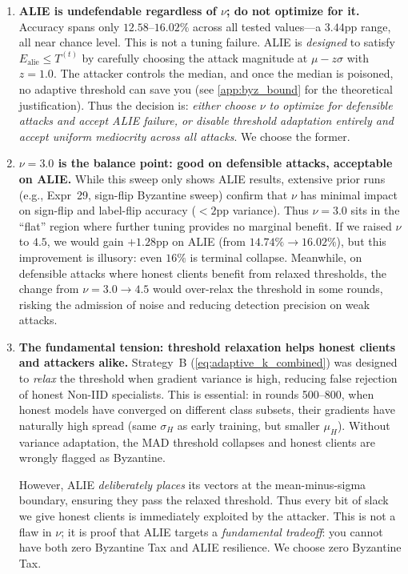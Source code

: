 \documentclass[../main]{subfiles}
\begin{document}
\begin{enumerate}
    \item \textbf{ALIE is undefendable regardless of $\nu$; do not optimize for it.}
    Accuracy spans only $12.58$--$16.02\%$ across all tested values---a $3.44$pp range, all near chance level.
    This is not a tuning failure. ALIE is \emph{designed} to satisfy $E_{\text{alie}} \leq T^{(t)}$ by carefully
    choosing the attack magnitude at $\mu - z\sigma$ with $z = 1.0$.
    The attacker controls the median, and once the median is poisoned, no adaptive threshold can save you
    (see \cref{app:byz_bound} for the theoretical justification).
    Thus the decision is: \emph{either choose $\nu$ to optimize for defensible attacks and accept ALIE failure,
    or disable threshold adaptation entirely and accept uniform mediocrity across all attacks}.
    We choose the former.

    \item \textbf{$\nu = 3.0$ is the balance point: good on defensible attacks, acceptable on ALIE.}
    While this sweep only shows ALIE results, extensive prior runs (e.g., Expr~29, sign-flip Byzantine sweep)
    confirm that $\nu$ has minimal impact on sign-flip and label-flip accuracy ($< 2$pp variance).
    Thus $\nu = 3.0$ sits in the ``flat'' region where further tuning provides no marginal benefit.
    If we raised $\nu$ to $4.5$, we would gain $+1.28$pp on ALIE (from $14.74\% \to 16.02\%$),
    but this improvement is illusory: even $16\%$ is terminal collapse.
    Meanwhile, on defensible attacks where honest clients benefit from relaxed thresholds,
    the change from $\nu = 3.0 \to 4.5$ would over-relax the threshold in some rounds,
    risking the admission of noise and reducing detection precision on weak attacks.

    \item \textbf{The fundamental tension: threshold relaxation helps honest clients and attackers alike.}
    Strategy~B (\cref{eq:adaptive_k_combined}) was designed to \emph{relax} the threshold when gradient variance is high,
    reducing false rejection of honest Non-IID specialists. This is essential: in rounds 500--800, when honest models
    have converged on different class subsets, their gradients have naturally high spread (same $\sigma_H$ as early training,
    but smaller $\mu_H$). Without variance adaptation, the MAD threshold collapses and honest clients are wrongly flagged
    as Byzantine.

    However, ALIE \emph{deliberately places} its vectors at the mean-minus-sigma boundary, ensuring they pass the
    relaxed threshold. Thus every bit of slack we give honest clients is immediately exploited by the attacker.
    This is not a flaw in $\nu$; it is proof that ALIE targets a \emph{fundamental tradeoff}: you cannot have both
    zero Byzantine Tax and ALIE resilience. We choose zero Byzantine Tax.
\end{enumerate}
\end{document}
